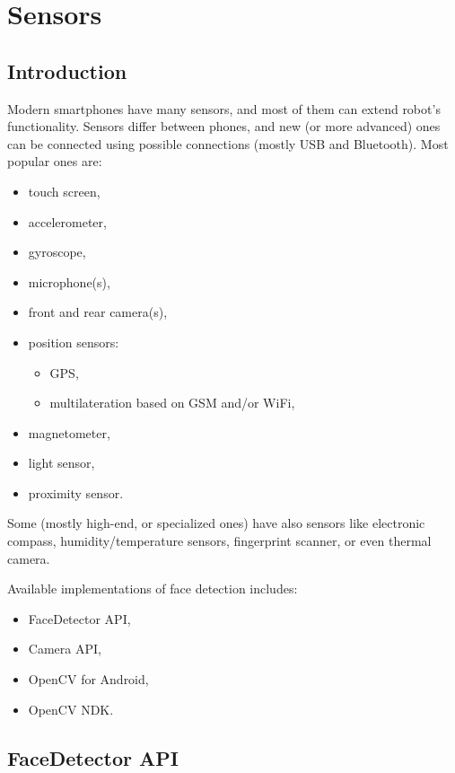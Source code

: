 \chapter{Sensors}

\section{Introduction}
Modern smartphones have many sensors, and most of them can extend robot's
functionality. Sensors differ between phones, and new (or more advanced) ones can
be connected using possible connections (mostly USB and Bluetooth).
Most popular ones are:
\begin{itemize}
  \item touch screen,
  \item accelerometer,
  \item gyroscope,
  \item microphone(s),
  \item front and rear camera(s),
  \item position sensors:
  \begin{itemize}
    \item GPS,
    \item multilateration based on GSM and/or WiFi,
  \end{itemize}
  \item magnetometer,
  \item light sensor,
  \item proximity sensor.
\end{itemize}
Some (mostly high-end, or specialized ones) have also sensors like electronic
compass, humidity/temperature sensors, fingerprint scanner, or even thermal
camera.

Available implementations of face detection includes:
\begin{itemize}
  \item FaceDetector API,
  \item Camera API,
  \item OpenCV for Android,
  \item OpenCV NDK.
\end{itemize}


\section{FaceDetector API}

